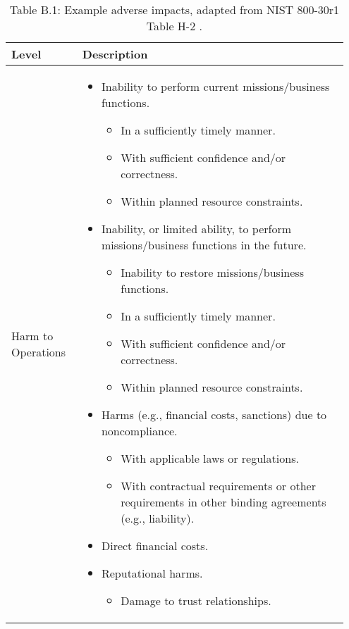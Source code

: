 \documentclass[fleqn]{article}
\begin{document}
\begin{table}[H]
    \caption*{Table B.1: Example adverse impacts, adapted from NIST 800-30r1 Table H-2 \cite{nist80030r1}.}
    \footnotesize
        \begin{tabular}{|m{0.20\linewidth} | m{0.75\linewidth}|}
            \hline
            \textbf{Level} & \textbf{Description} \\ \hline
            Harm to Operations & 
            \begin{itemize}[noitemsep]
           		\item Inability to perform current missions/business functions.
           		\begin{itemize}[noitemsep,nolistsep]
           			\item In a sufficiently timely manner.
           			\item With sufficient confidence and/or correctness.
           			\item Within planned resource constraints.
           		\end{itemize}
           		\item Inability, or limited ability, to perform missions/business functions in the future.           	
           		\begin{itemize}[noitemsep,nolistsep]
           			\item Inability to restore missions/business functions.
           			\item In a sufficiently timely manner.
					\item With sufficient confidence and/or correctness.
					\item Within planned resource constraints.
           		\end{itemize}
           		\item Harms (e.g., financial costs, sanctions) due to noncompliance. 
           		\begin{itemize}[noitemsep,nolistsep]
           			\item With applicable laws or regulations.
           			\item With contractual requirements or other requirements in other binding agreements (e.g., liability).
           		\end{itemize}
           		\item Direct financial costs.
           		\item Reputational harms.	
           		\begin{itemize}[noitemsep,nolistsep]
           			\item Damage to trust relationships.

\end{itemize}
\end{itemize}
\end{tabular}
\end{table}
\end{document}
